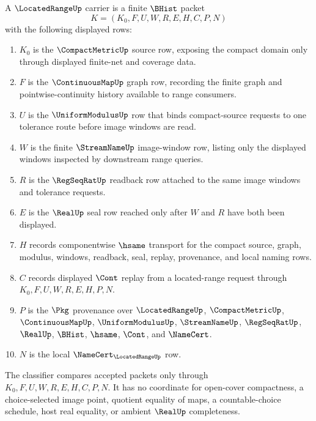 \begin{definition}
\label{def:located-range-carrier}
A $\LocatedRangeUp$ carrier is a finite $\BHist$ packet
$$
K=(K_0,F,U,W,R,E,H,C,P,N)
$$
with the following displayed rows:
\begin{enumerate}
\item $K_0$ is the $\CompactMetricUp$ source row, exposing the compact domain only through displayed finite-net and coverage data.
\item $F$ is the $\ContinuousMapUp$ graph row, recording the finite graph and pointwise-continuity history available to range consumers.
\item $U$ is the $\UniformModulusUp$ row that binds compact-source requests to one tolerance route before image windows are read.
\item $W$ is the finite $\StreamNameUp$ image-window row, listing only the displayed windows inspected by downstream range queries.
\item $R$ is the $\RegSeqRatUp$ readback row attached to the same image windows and tolerance requests.
\item $E$ is the $\RealUp$ seal row reached only after $W$ and $R$ have both been displayed.
\item $H$ records componentwise $\hsame$ transport for the compact source, graph, modulus, windows, readback, seal, replay, provenance, and local naming rows.
\item $C$ records displayed $\Cont$ replay from a located-range request through $K_0,F,U,W,R,E,H,P,N$.
\item $P$ is the $\Pkg$ provenance over $\LocatedRangeUp$, $\CompactMetricUp$, $\ContinuousMapUp$, $\UniformModulusUp$, $\StreamNameUp$, $\RegSeqRatUp$, $\RealUp$, $\BHist$, $\hsame$, $\Cont$, and $\NameCert$.
\item $N$ is the local $\NameCert_{\LocatedRangeUp}$ row.
\end{enumerate}
The classifier compares accepted packets only through $K_0,F,U,W,R,E,H,C,P,N$. It has no coordinate for open-cover compactness, a choice-selected image point, quotient equality of maps, a countable-choice schedule, host real equality, or ambient $\RealUp$ completeness.
\end{definition}

